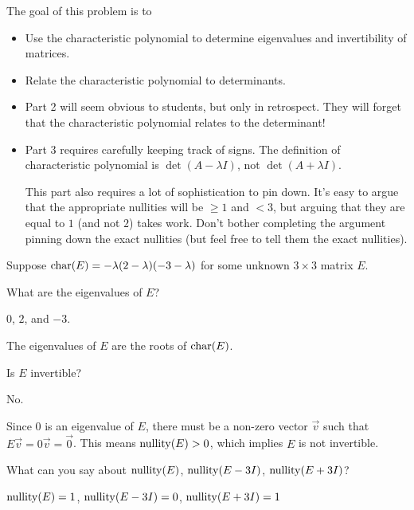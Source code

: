 \documentclass{workbook}
\newcommand{\bookonlynewpage}{\begin{bookonly}\newpage\end{bookonly}}
\begin{document}
\begin{slide}

	\bookonlynewpage
	\question
	\begin{annotation}
		\begin{goals}

			The goal of this problem is to
			\begin{itemize}
				\item Use the characteristic polynomial to determine eigenvalues
					and invertibility of matrices.
				\item Relate the characteristic polynomial to determinants.
			\end{itemize}
		\end{goals}

		\begin{notes}
			\begin{itemize}
				\item Part 2 will seem obvious to students, but only
					in retrospect. They will forget that the characteristic polynomial
					relates to the determinant!
				\item Part 3 requires carefully keeping track of signs. The definition of characteristic
					polynomial is $\det(A-\lambda I)$, not $\det(A+\lambda I)$.

					This part also requires a lot of sophistication to pin down.
					It's easy to argue that the appropriate nullities will be $\geq 1$
					and $<3$, but arguing that they are equal to $1$ (and not $2$) takes work.
					Don't bother completing the argument pinning down the exact nullities
					(but feel free to tell them the exact nullities).
			\end{itemize}
		\end{notes}
	\end{annotation}
	Suppose $\operatorname{char}(E)=-\lambda(2-\lambda)(-3-\lambda)$ for some unknown $3\times 3$
	matrix $E$.
	\begin{parts}
		\item What are the eigenvalues of $E$?
			\begin{solution}
				$0$, $2$, and $-3$.

				The eigenvalues of $E$ are the roots of $\operatorname{char}(E)$.
			\end{solution}
		\item Is $E$ invertible?
			\begin{solution}
				No.

				Since $0$ is an eigenvalue of $E$, there must be a non-zero vector
				$\vec v$ such that $E\vec v=0\vec v=\vec 0$. This means $\operatorname{nullity}(E)>0$,
				which implies $E$ is not invertible.
			\end{solution}
		\item What can you say about $\operatorname{nullity}(E)$, $\operatorname{nullity}(E-3I)$, $\operatorname{nullity}(E+3I)$?
			\begin{solution}
				$\operatorname{nullity}(E)=1$, $\operatorname{nullity}(E-3I)=0$, $\operatorname{nullity}(E+3I)=1$


\end{solution}
\end{parts}
\end{slide}
\end{document}
